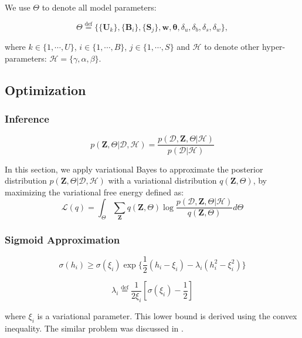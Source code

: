 We use $\Theta$ to denote all model parameters:

\begin{equation}
\Theta \overset{\mathrm{def}}= \Big\{\{\bm{U}_k\}, \{\bm{B}_i\}, \{\bm{S}_j\}, \bm{w}, \boldsymbol{\theta}, \delta_u,\delta_b,\delta_s,\delta_w \Big\},
\end{equation}

\noindent where $k \in \{1, \cdots, U\}$, $i \in \{1, \cdots, B\}$, $j \in \{1, \cdots, S\}$ and $\mathcal{H}$ to denote other hyper-parameters: $\mathcal{H} = \{\gamma, \alpha,\beta\}$.


\subsection{Optimization}

\subsubsection{Inference}

\begin{equation}
p(\bm{Z},\Theta|\mathcal{D},\mathcal{H}) = \frac{p(\mathcal{D},\bm{Z},\Theta|\mathcal{H})}{p(\mathcal{D}|\mathcal{H})}
\end{equation}

In this section, we apply variational Bayes to approximate the posterior distribution $p(\bm{Z},\Theta|\mathcal{D},\mathcal{H})$ with a variational distribution $q(\bm{Z},\Theta)$, by maximizing the variational free energy defined as:
\begin{equation}
\mathcal{L}(q)= \int_\Theta \sum_{\bm{Z}} q(\bm{Z},\Theta) \log\frac{p(\mathcal{D},\bm{Z},\Theta|\mathcal{H})}{q(\bm{Z},\Theta)}d\Theta
\end{equation}

\subsubsection{Sigmoid Approximation}

\begin{equation}
\sigma(h_{i}) \geq \sigma(\xi_{i})\exp\big\{\frac{1}{2}(h_{i}-\xi_{i})-\lambda_{i}(h_{i}^2-\xi_{i}^2)\big\}
\end{equation}

$$\lambda_{i}\overset{\mathrm{def}}=\frac{1}{2\xi_{i}}[\sigma(\xi_{i})-\frac{1}{2}]$$

\noindent where $\xi_{i}$ is a variational parameter. This lower bound is derived using the convex inequality. The similar problem was discussed in \cite{jaakkola1997variational,jordan1999introduction}.


